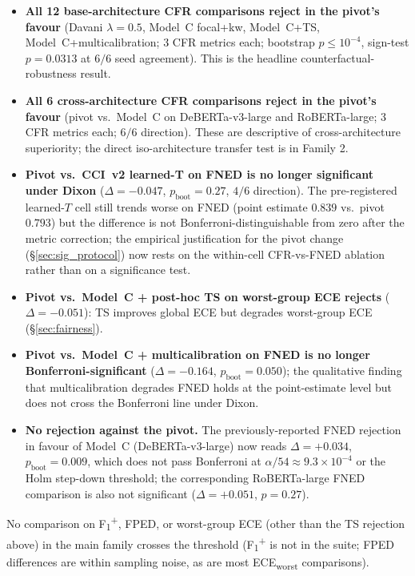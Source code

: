 \documentclass[10pt,a4paper]{article}
\begin{document}
\begin{itemize}[leftmargin=*,itemsep=2pt]
    \item \textbf{All 12 base-architecture CFR comparisons reject in the pivot's favour} (Davani $\lambda{=}0.5$, Model~C focal+kw, Model~C+TS, Model~C+multicalibration; 3 CFR metrics each; bootstrap $p \le 10^{-4}$, sign-test $p = 0.0313$ at $6/6$ seed agreement). This is the headline counterfactual-robustness result.
    \item \textbf{All 6 cross-architecture CFR comparisons reject in the pivot's favour} (pivot vs.\ Model~C on DeBERTa-v3-large and RoBERTa-large; 3 CFR metrics each; $6/6$ direction). These are descriptive of cross-architecture superiority; the direct iso-architecture transfer test is in Family 2.
    \item \textbf{Pivot vs.\ CCI~v2 learned-T on FNED is no longer significant under Dixon} ($\Delta = -0.047$, $p_{\text{boot}} = 0.27$, $4/6$ direction). The pre-registered learned-$T$ cell still trends worse on FNED (point estimate $0.839$ vs.\ pivot $0.793$) but the difference is not Bonferroni-distinguishable from zero after the metric correction; the empirical justification for the pivot change (\S\ref{sec:sig_protocol}) now rests on the within-cell CFR-vs-FNED ablation rather than on a significance test.
    \item \textbf{Pivot vs.\ Model~C + post-hoc TS on worst-group ECE rejects} ($\Delta = -0.051$): TS improves global ECE but degrades worst-group ECE (\S\ref{sec:fairness}).
    \item \textbf{Pivot vs.\ Model~C + multicalibration on FNED is no longer Bonferroni-significant} ($\Delta = -0.164$, $p_{\text{boot}} = 0.050$); the qualitative finding that multicalibration degrades FNED holds at the point-estimate level but does not cross the Bonferroni line under Dixon.
    \item \textbf{No rejection against the pivot.} The previously-reported FNED rejection in favour of Model~C (DeBERTa-v3-large) now reads $\Delta = +0.034$, $p_{\text{boot}} = 0.009$, which does not pass Bonferroni at $\alpha/54 \approx 9.3\times 10^{-4}$ or the Holm step-down threshold; the corresponding RoBERTa-large FNED comparison is also not significant ($\Delta = +0.051$, $p = 0.27$).
\end{itemize}
No comparison on F\textsubscript{1}\textsuperscript{+}, FPED, or worst-group ECE (other than the TS rejection above) in the main family crosses the threshold (F\textsubscript{1}\textsuperscript{+} is not in the suite; FPED differences are within sampling noise, as are most ECE\textsubscript{worst} comparisons).
\end{document}
